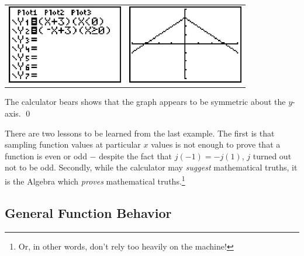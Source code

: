 \begin{ex}
\begin{enumerate}
\begin{center}

\begin{tabular}{cc}

\includegraphics[width=2in]{./RelationsandFunctionsGraphics/PWISE01.jpg} \hspace{.75in} & \includegraphics[width=2in]{./RelationsandFunctionsGraphics/PWISE02.jpg} \\

\end{tabular}

\end{center}
 
The calculator bears shows that the graph appears to be symmetric about the $y$-axis. \qed

\end{enumerate}

\end{ex}

There are two lessons to be learned from the last example.  The first is that sampling function values at particular $x$ values is not enough to prove that a function is even or odd $-$ despite the fact that $j(-1) = - j(1)$, $j$ turned out not to be odd.  Secondly, while the calculator may \emph{suggest} mathematical truths, it is the Algebra which \emph{proves} mathematical truths.\footnote{Or, in other words, don't rely too heavily on the machine!}

\medskip

\subsection{General Function Behavior}
\label{genfuncbehavior}


